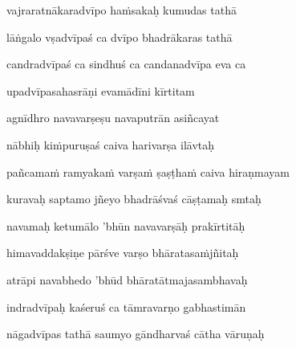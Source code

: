 vajraratnākaradvīpo haṁsakaḥ kumudas tathā \veg\dontdisplaylinenum
{}

lāṅgalo vṣadvīpaś ca dvīpo bhadrākaras tathā\thinspace{\dandab} \dontdisplaylinenum

candradvīpaś ca sindhuś ca candanadvīpa eva ca \danda\dontdisplaylinenum

upadvīpasahasrāṇi evamādīni kīrtitam \veg\dontdisplaylinenum



agnīdhro navavarṣeṣu navaputrān asiñcayat\thinspace{\dandab} \dontdisplaylinenum

nābhiḥ kiṁpuruṣaś caiva harivarṣa ilāvtaḥ \veg\dontdisplaylinenum
{}

pañcamaṁ ramyakaṁ varṣaṁ ṣaṣṭhaṁ caiva hiraṇmayam\thinspace{\dandab} \dontdisplaylinenum

kuravaḥ saptamo jñeyo bhadrāśvaś cāṣṭamaḥ smtaḥ \veg\dontdisplaylinenum
{}

navamaḥ ketumālo 'bhūn navavarṣāḥ prakīrtitāḥ\thinspace{\dandab} \dontdisplaylinenum

himavaddakṣiṇe pārśve varṣo bhāratasaṁjñitaḥ \veg\dontdisplaylinenum
{}

atrāpi navabhedo 'bhūd bhāratātmajasambhavaḥ\thinspace{\dandab} \dontdisplaylinenum

indradvīpaḥ kaśeruś ca tāmravarṇo gabhastimān \veg\dontdisplaylinenum
{}

nāgadvīpas tathā saumyo gāndharvaś cātha vāruṇaḥ\thinspace{\dandab} \dontdisplaylinenum

